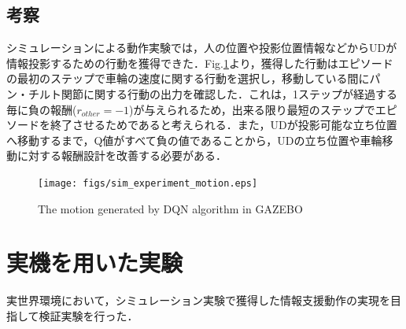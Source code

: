 \documentclass[12pt]{sonota/aislab}
\begin{document}


\subsection{考察}
シミュレーションによる動作実験では，人の位置や投影位置情報などからUDが情報投影するための行動を獲得できた．Fig.\ref{sim_experiment_motion}より，獲得した行動はエピソードの最初のステップで車輪の速度に関する行動を選択し，移動している間にパン・チルト関節に関する行動の出力を確認した．これは，1ステップが経過する毎に負の報酬($r_{other}=-1$)が与えられるため，出来る限り最短のステップでエピソードを終了させるためであると考えられる．また，UDが投影可能な立ち位置へ移動するまで，Q値がすべて負の値であることから，UDの立ち位置や車輪移動に対する報酬設計を改善する必要がある．

\begin{figure}[t]
\begin{center}
\texttt{[image: figs/sim\_experiment\_motion.eps]}
\caption{The motion generated by DQN algorithm in GAZEBO}
\label{sim_experiment_motion}
\end{center}
\end{figure}

\clearpage

\section{実機を用いた実験}
実世界環境において，シミュレーション実験で獲得した情報支援動作の実現を目指して検証実験を行った．
\end{document}
